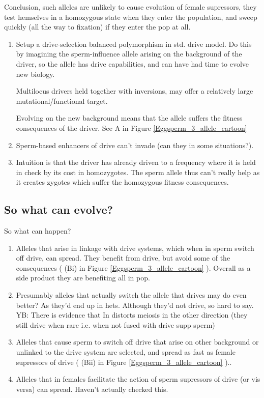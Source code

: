 \documentclass[12pt,letterpaper]{article}
\begin{document}
Conclusion, such alleles are unlikely to cause evolution of female supressors, they test hemselves in a homozygous
state when they enter the population, and sweep quickly (all the way to fixation) if they enter the pop at all.\\


\begin{enumerate}
\item Setup a drive-selection balanced polymorphism in std. drive model. 
Do this by imagining the sperm-influence allele arising on the background of the driver, 
so the allele has drive capabilities, and can have had time to evolve new biology. 

Multilocus drivers held together with inversions, may offer a relatively large mutational/functional target.

Evolving on the new background means that the allele suffers the fitness consequences of the 
driver.  See A in Figure \ref{Eggsperm_3_allele_cartoon} \\
\item Sperm-based enhancers of drive can't invade (can they in some situations?). \\
\item Intuition is that the driver has already driven to a frequency 
where it is held in check by its cost in homozygotes. The sperm allele 
thus can't really help as it creates zygotes which suffer the homozygous fitness consequences.
\end{enumerate}

\subsection{So what can evolve?}
So what can happen?
\begin{enumerate}
\item Alleles that arise in linkage with drive systems, which when in sperm switch off drive, 
can spread. They benefit from drive, but avoid some of the
consequences ( (Bi) in Figure \ref{Eggsperm_3_allele_cartoon} ). Overall as a side product they are benefiting all in pop.\\
\item Presumably alleles that actually switch the allele that drives may do even better? As they'd end up in 
hets. Although they'd not drive, so hard to say. YB: There is evidence that In distorts meiosis in the other direction (they still drive when rare i.e. when not fused with drive supp sperm) \\
\item Alleles that cause sperm to switch off drive that arise on other background or unlinked to the drive system
are selected, and spread as fast as female supressors of drive ( (Bii) in Figure \ref{Eggsperm_3_allele_cartoon} )..\\
\item Alleles that in females facilitate the action of sperm supressors of drive (or vis versa) can spread. Haven't actually checked this.\\
\end{enumerate}
\end{document}
